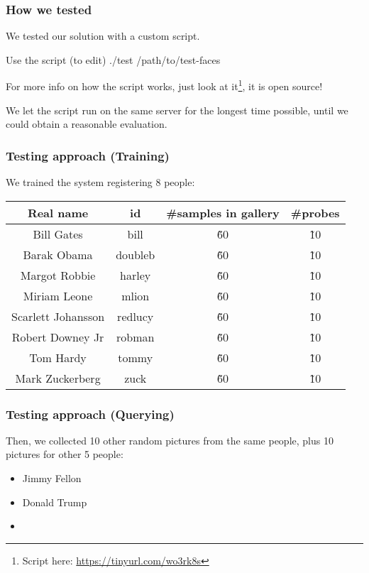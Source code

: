 \begin{frame} \frametitle{How we tested}

	We tested our solution with a custom script.
	
	\vfill

	\begin{block}{Use the script (to edit)}
		./test /path/to/test-faces
	\end{block}
	
	For more info on how the script works, just look at 
	it\footnote{Script here: 
	{\color{red} \url{https://tinyurl.com/wo3rk8s}}}, 
	it is open source!

	\vfill
	
	We let the script run on the same server for the longest
	time possible, until we could obtain a reasonable evaluation.

\end{frame}

\begin{frame} \frametitle{Testing approach (Training)}

	We trained the system registering 8 people:
	
	\begin{center}
 		\begin{tabular}{||c | c | c | c||} 
			 \hline
			 	\textbf{Real name} & 
			 	\textbf{id} & 
			 	\textbf{\#samples in gallery} & 
			 	\textbf{\#probes} 
			 \\ [0.5ex] 
			 \hline\hline
			 	Bill Gates & 
			 	bill & 
			 	\~60 & 
			 	\~10 
			 \\ 
			 \hline
			 	Barak Obama & 
			 	doubleb & 
			 	\~60 & 
			 	\~10 
			 \\
			 \hline
			 	Margot Robbie & 
				harley & 
			 	\~60 & 
			 	\~10 
			 \\
			 \hline
			 	Miriam Leone & 
			 	mlion & 
			 	\~60 & 
			 	\~10 
			 \\
			 \hline
			 	Scarlett Johansson & 
			 	redlucy & 
			 	\~60 & 
			 	\~10 
			\\
			 \hline
			 	Robert Downey Jr & 
				robman & 
			 	\~60 & 
			 	\~10 
			 \\
			 \hline
			 	Tom Hardy & 
			 	tommy & 
			 	\~60 & 
			 	\~10
			\\
			 \hline
			 	Mark Zuckerberg & 
			 	zuck & 
			 	\~60 & 
			 	\~10
			\\ [1ex] 
 			\hline
		\end{tabular}
	\end{center}	

\end{frame}

\begin{frame} \frametitle{Testing approach (Querying)}
	
	Then, we collected 10 other random pictures from the same 
	people, plus 10 pictures for other 5 people:
	
	\begin{itemize}
		\item Jimmy Fellon
		\item Donald Trump
		\item 
	\end{itemize}

\end{frame}
